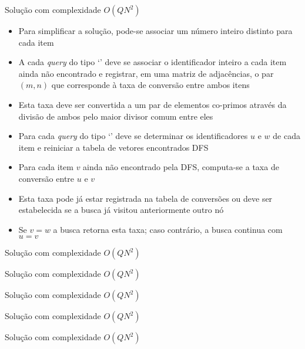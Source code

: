 \begin{frame}[fragile]{Solução com complexidade $O(QN^2)$}

    \begin{itemize}
        \item Para simplificar a solução, pode-se associar um número inteiro distinto para cada 
            item

        \item A cada \textit{query} do tipo `' deve se associar o identificador 
            inteiro a cada item ainda não encontrado e registrar, em uma matriz de adjacências,
            o par $(m, n)$ que corresponde à taxa de conversão entre ambos itens

        \item Esta taxa deve ser convertida a um par de elementos co-primos através da divisão de
            ambos pelo maior divisor comum entre eles

        \item Para cada \textit{query} do tipo `' deve se determinar os identificadores
            $u$ e $w$ de cada item e reiniciar a tabela de vetores encontrados DFS

        \item Para cada item $v$ ainda não encontrado pela DFS, computa-se a taxa de conversão
            entre $u$ e $v$

        \item Esta taxa pode já estar registrada na tabela de conversões ou deve ser estabelecida
            se a busca já visitou anteriormente outro nó

        \item Se $v = w$ a busca retorna esta taxa; caso contrário, a busca continua com $u = v$
   \end{itemize}

\end{frame}

\begin{frame}[fragile]{Solução com complexidade $O(QN^2)$}
\end{frame}

\begin{frame}[fragile]{Solução com complexidade $O(QN^2)$}
\end{frame}

\begin{frame}[fragile]{Solução com complexidade $O(QN^2)$}
\end{frame}

\begin{frame}[fragile]{Solução com complexidade $O(QN^2)$}
\end{frame}

\begin{frame}[fragile]{Solução com complexidade $O(QN^2)$}
\end{frame}
